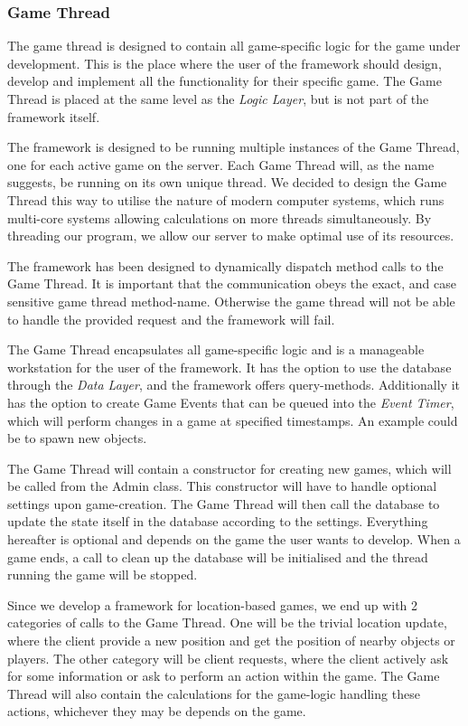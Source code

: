 \subsubsection{Game Thread}\label{designgamethread}
The game thread is designed to contain all game-specific logic for the game under development. This is the place where the user of the framework should design, develop and implement all the functionality for their specific game. The Game Thread is placed at the same level as the \textit{Logic Layer}, but is not part of the framework itself. 

The framework is designed to be running multiple instances of the Game Thread, one for each active game on the server. Each Game Thread will, as the name suggests, be running on its own unique thread. We decided to design the Game Thread this way to utilise the nature of modern computer systems, which runs multi-core systems allowing calculations on more threads simultaneously. By threading our program, we allow our server to make optimal use of its resources.

The framework has been designed to dynamically dispatch method calls to the Game Thread. It is important that the communication obeys the exact, and case sensitive game thread method-name. Otherwise the game thread will not be able to handle the provided request and the framework will fail. 

The Game Thread encapsulates all game-specific logic and is a manageable workstation for the user of the framework. It has the option to use the database through the \textit{Data Layer}, and the framework offers query-methods. Additionally it has the option to create Game Events that can be queued into the \textit{Event Timer}, which will perform changes in a game at specified timestamps. An example could be to spawn new objects.

The Game Thread will contain a constructor for creating new games, which will be called from the Admin class. This constructor will have to handle optional settings upon game-creation. The Game Thread will then call the database to update the state itself in the database according to the settings. Everything hereafter is optional and depends on the game the user wants to develop. When a game ends, a call to clean up the database will be initialised and the thread running the game will be stopped.

Since we develop a framework for location-based games, we end up with 2 categories of calls to the Game Thread. One will be the trivial location update, where the client provide a new position and get the position of nearby objects or players. The other category will be client requests, where the client actively ask for some information or ask to perform an action within the game. The Game Thread will also contain the calculations for the game-logic handling these actions, whichever they may be depends on the game. 